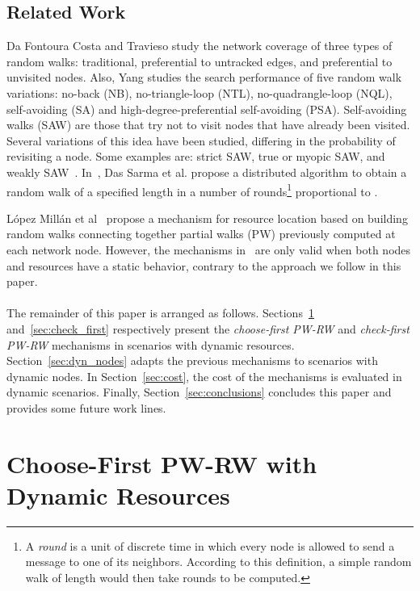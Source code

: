 \documentclass[]{elsarticle}
\begin{document}
\subsection{Related Work}

Da Fontoura Costa and Travieso \cite{rw:Costa07} study the network coverage of three types of random walks: traditional, preferential to untracked edges, and preferential to unvisited nodes. Also, Yang \cite{rw:Yang05} studies the search performance of five random walk variations: no-back (NB), no-triangle-loop (NTL), no-quadrangle-loop (NQL), self-avoiding (SA) and high-degree-preferential self-avoiding (PSA). Self-avoiding walks (SAW) are those that try not to visit nodes that have already been visited. Several variations of this idea have been studied, differing in the probability of revisiting a node. Some examples are: strict SAW, true or myopic SAW, and weakly SAW~\cite{rw:Amit83,rw:Slade09}. In~\cite{rw:DasSarma10}, Das Sarma et al. propose a distributed algorithm to obtain a random walk of a specified length  in a number of rounds\footnote{A \emph{round} is a unit of discrete time in which every node is allowed to send a message to one of its neighbors. According to this definition, a simple random walk of length  would then take  rounds to be computed.} proportional to .

L\'opez Mill\'an et al~\cite{Lopez:Computing} propose a mechanism for resource location based on building random walks connecting together partial walks (PW) previously computed at each network node.  However, the mechanisms in~\cite{Lopez:Computing} are only valid when both nodes and resources have a static behavior, contrary to the approach we follow in this paper. \\ \\

The remainder of this paper is arranged as follows. Sections~\ref{sec:choose_first} and~\ref{sec:check_first} respectively present the \emph{choose-first PW-RW} and \emph{check-first PW-RW} mechanisms in scenarios with dynamic resources. Section~\ref{sec:dyn_nodes} adapts the previous mechanisms to scenarios with dynamic nodes. In Section~\ref{sec:cost}, the cost of the mechanisms is evaluated in dynamic scenarios. Finally, Section~\ref{sec:conclusions} concludes this paper and provides some future work lines.

\section{Choose-First PW-RW with Dynamic Resources}
\label{sec:choose_first}
\end{document}
